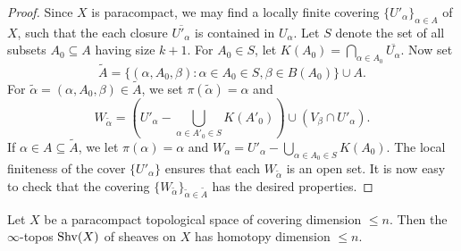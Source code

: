 \begin{proof}
Since $X$ is paracompact, we may find a locally finite covering
$\{ U'_{\alpha} \}_{\alpha \in A}$ of $X$, such that the
each closure $\overline{ U'_{\alpha} }$ is contained in
$U_{\alpha}$. Let $S$ denote the set of all subsets $A_0 \subseteq
A$ having size $k+1$. For $A_0 \in S$, let $K(A_0) = \bigcap_{\alpha
\in A_0} \overline{U_{\alpha}}$. Now set 
$$\widetilde{A} = \{ (\alpha, A_0, \beta): \alpha \in A_0 \in S, \beta \in
B(A_0) \} \cup A.$$ 
For $\widetilde{\alpha} = (\alpha, A_0, \beta) \in \widetilde{A}$, we
set $\pi(\widetilde{\alpha}) = \alpha$ and 
$$W_{\widetilde{\alpha}} =
(U'_{\alpha} - \bigcup_{\alpha \in A'_0 \in S} K(A'_0) ) \cup (V_{\beta}
\cap U'_{\alpha}).$$
If $\alpha \in A \subseteq \widetilde{A}$, we let $\pi(\alpha) =
\alpha$ and $W_{\alpha} = U'_{\alpha} - \bigcup_{\alpha \in A_0 \in S}
K(A_0)$. The local finiteness of the cover $\{ U'_{\alpha} \}$ ensures that each
$W_{\widetilde{\alpha}}$ is an open set. It is now easy to check that the covering $\{ W_{ \widetilde{\alpha} } \}_{\widetilde{\alpha} \in \widetilde{A}}$ has the desired properties.
\end{proof}

\begin{theorem}\label{paradimension}
Let $X$ be a paracompact topological space of covering dimension
$\leq n$. Then the $\infty$-topos $\operatorname{Shv}(X)$ of sheaves on $X$ has
homotopy dimension $\leq n$.
\end{theorem}

